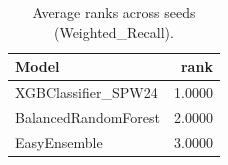 \begin{table}[t]
\centering
\begin{tabular}{lr}
\toprule
Model & rank \\
\midrule
XGBClassifier_SPW24 & 1.0000 \\
BalancedRandomForest & 2.0000 \\
EasyEnsemble & 3.0000 \\
\bottomrule
\end{tabular}
\caption{Average ranks across seeds (Weighted_Recall).}
\label{tab:avg_rank_Weighted_Recall}
\end{table}